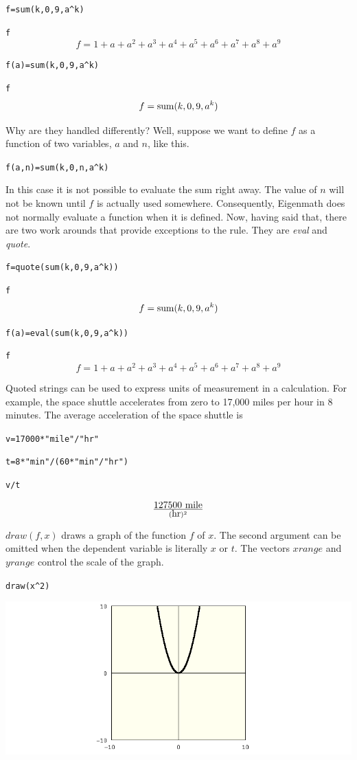 \documentclass[11pt]{article}
\begin{document}
\medskip
\verb$f=sum(k,0,9,a^k)$

\verb$f$
$$f=1+a+a^2+a^3+a^4+a^5+a^6+a^7+a^8+a^9$$

\verb$f(a)=sum(k,0,9,a^k)$

\verb$f$
$$f=\mathop{\rm sum}(k,0,9,a^k)$$

\medskip
\noindent
Why are they handled differently?
Well, suppose we want to define $f$ as a function of two variables,
$a$ and $n$, like this.

\medskip
\verb$f(a,n)=sum(k,0,n,a^k)$

\medskip
\noindent
In this case it is not possible to evaluate the sum right away.
The value of $n$ will not be known until $f$ is actually used somewhere.
Consequently, Eigenmath does not normally evaluate a function when it is defined.
Now, having said that, there are two work arounds that provide exceptions to the rule.
They are {\it eval} and {\it quote}.
 
\medskip
\verb$f=quote(sum(k,0,9,a^k))$

\verb$f$
$$f=\mathop{\rm sum}(k,0,9,a^k)$$

\verb$f(a)=eval(sum(k,0,9,a^k))$

\verb$f$
$$f=1+a+a^2+a^3+a^4+a^5+a^6+a^7+a^8+a^9$$

\newpage


\noindent
Quoted strings can be used to express units of measurement in a calculation.
For example, the space shuttle accelerates from zero to
17{,}000 miles per hour in 8 minutes.
The average acceleration of the space shuttle is

\medskip
\verb$v=17000*"mile"/"hr"$

\verb$t=8*"min"/(60*"min"/"hr")$

\verb$v/t$

$$\hbox{127500 mile}\over(\hbox{hr})^2$$



\newpage

%

\newpage


\noindent
$draw(f,x)$ draws a graph of the function $f$ of $x$.
The second argument can be omitted when the dependent variable
is literally $x$ or $t$.
The vectors $xrange$ and $yrange$ control the scale of the graph.

\medskip
\verb$draw(x^2)$

\medskip
\begin{center}
\includegraphics[scale=0.4]{parabola.png}
\end{center}
\end{document}

